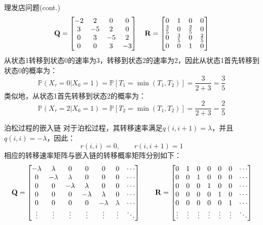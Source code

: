 \documentclass[t]{beamer}
\renewcommand{\Pr}{\mathbb{P}}
\begin{document}
\begin{frame}{理发店问题(cont.)}
  \begin{equation*}
    {\bf Q}=\begin{bmatrix}
      -2 & 2 & 0&0\\
      3&-5&2&0\\
      0&3&-5&2\\
      0&0&3&-3
      \end{bmatrix}\quad  {\bf R}=\begin{bmatrix}
    0 & 1 & 0&0\\
  \frac{3}{5}&0&\frac{2}{5}&0\\
  0&\frac{3}{5}&0&\frac{2}{5}\\
    0&0&1&0
    \end{bmatrix}
    \end{equation*}
    从状态1转移到状态0的速率为3，转移到状态2的速率为2，因此从状态1首先转移到状态0的概率为：
    \begin{equation*}
    \Pr(X_{\tau}=0|X_0=1)=\Pr[T_1=\min(T_1,T_2)]=\frac{3}{2+3}=\frac{3}{5}
    \end{equation*}
    类似地，从状态1首先转移到状态2的概率为：
    \begin{equation*}
    \Pr(X_{\tau}=2|X_0=1)=\Pr[T_2=\min(T_1,T_2)]=\frac{2}{2+3}=\frac{2}{5}
    \end{equation*}
  
\end{frame}


\begin{frame}{泊松过程的嵌入链}\small
  对于泊松过程，其转移速率满足$q(i,i+1)=\lambda$，并且$q(i,i)=-\lambda$，因此：
\[r(i,i)=0,\qquad r(i,i+1)=1 \]
相应的转移速率矩阵与嵌入链的转移概率矩阵分别如下：
\[{\bf Q}=\begin{bmatrix}
-\lambda & \lambda&0&0&0&0&\cdots\\
0&-\lambda & \lambda&0&0&0&\cdots\\
0&0&-\lambda & \lambda&0&0&\cdots\\
0&0&0&-\lambda & \lambda&0&\cdots\\
0&0&0&0&-\lambda & \lambda&\cdots\\
\vdots &\vdots&\vdots&\vdots&\vdots&\vdots&\ddots
\end{bmatrix} \qquad 
{\bf R}=\begin{bmatrix}
0 & 1&0&0&0&0&\cdots\\
0&0 & 1&0&0&0&\cdots\\
0&0&0 & 1&0&0&\cdots\\
0&0&0&0 & 1&0&\cdots\\
0&0&0&0&0 &1&\cdots\\
\vdots &\vdots&\vdots&\vdots&\vdots&\vdots&\ddots
\end{bmatrix}\]
\end{frame}
\end{document}
